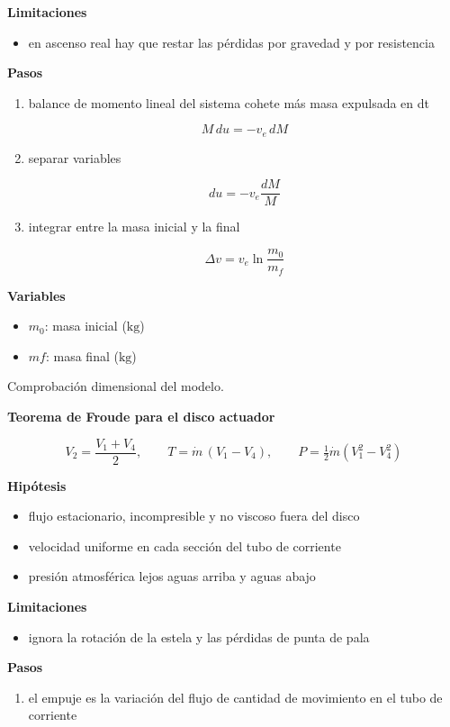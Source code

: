 \documentclass[10pt,openany]{book}
\begin{document}
\begin{tcolorbox}[title={Desarrollos del modelo}, studiumdef, breakable]
\noindent\textbf{Limitaciones}
\begin{itemize}
\item en ascenso real hay que restar las pérdidas por gravedad y por resistencia
\end{itemize}

\noindent\textbf{Pasos}
\begin{enumerate}
\item
balance de momento lineal del sistema cohete más masa expulsada en dt

\[
M\,du = -v_e\,dM
\]
\item
separar variables

\[
du = -v_e\frac{dM}{M}
\]
\item
integrar entre la masa inicial y la final

\[
\Delta v = v_e\ln\frac{m_0}{m_f}
\]
\end{enumerate}

\noindent\textbf{Variables}
\begin{itemize}
\item $m_{0}$: masa inicial ($\mathrm{kg}$)
\item $mf$: masa final ($\mathrm{kg}$)
\end{itemize}

{\noindent\footnotesize Comprobación dimensional del modelo.\par}

\noindent\textbf{Teorema de Froude para el disco actuador}

\[
V_2 = \frac{V_1 + V_4}{2},\qquad T = \dot m\,(V_1 - V_4),\qquad P = \tfrac12\dot m\left(V_1^{2} - V_4^{2}\right)
\]

\noindent\textbf{Hipótesis}
\begin{itemize}
\item flujo estacionario, incompresible y no viscoso fuera del disco
\item velocidad uniforme en cada sección del tubo de corriente
\item presión atmosférica lejos aguas arriba y aguas abajo
\end{itemize}

\noindent\textbf{Limitaciones}
\begin{itemize}
\item ignora la rotación de la estela y las pérdidas de punta de pala
\end{itemize}

\noindent\textbf{Pasos}
\begin{enumerate}
\item
el empuje es la variación del flujo de cantidad de movimiento en el tubo de corriente


\end{enumerate}
\end{tcolorbox}
\end{document}
